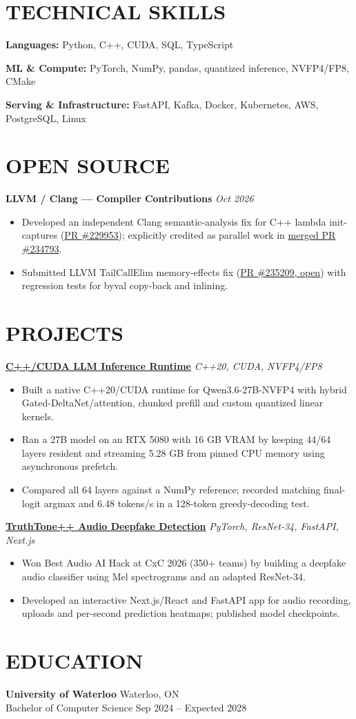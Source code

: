 \documentclass[11pt,letterpaper]{article}
\begin{document}
\section*{TECHNICAL SKILLS}
\noindent\textbf{Languages:} Python, C++, CUDA, SQL, TypeScript\par
\noindent\textbf{ML \& Compute:} PyTorch, NumPy, pandas, quantized inference, NVFP4/FP8, CMake\par
\noindent\textbf{Serving \& Infrastructure:} FastAPI, Kafka, Docker, Kubernetes, AWS, PostgreSQL, Linux\par
\section*{OPEN SOURCE}
\noindent\textbf{LLVM / Clang --- Compiler Contributions} \hfill \textit{Oct 2026}\par
\begin{itemize}
\item Developed an independent Clang semantic-analysis fix for C++ lambda init-captures (\href{https://github.com/llvm/llvm-project/pull/229953}{PR \#229953}); explicitly credited as parallel work in \href{https://github.com/llvm/llvm-project/pull/234793}{merged PR \#234793}.
\item Submitted LLVM TailCallElim memory-effects fix (\href{https://github.com/llvm/llvm-project/pull/235209}{PR \#235209, open}) with regression tests for byval copy-back and inlining.
\end{itemize}
\section*{PROJECTS}
\noindent\href{https://github.com/beanscrack/LLM-Inference-C-CUDA-}{\textbf{C++/CUDA LLM Inference Runtime}} \hfill \textit{C++20, CUDA, NVFP4/FP8}\par
\begin{itemize}
\item Built a native C++20/CUDA runtime for Qwen3.6-27B-NVFP4 with hybrid Gated-DeltaNet/attention, chunked prefill and custom quantized linear kernels.
\item Ran a 27B model on an RTX 5080 with 16 GB VRAM by keeping 44/64 layers resident and streaming 5.28 GB from pinned CPU memory using asynchronous prefetch.
\item Compared all 64 layers against a NumPy reference; recorded matching final-logit argmax and 6.48 tokens/s in a 128-token greedy-decoding test.
\end{itemize}
\noindent\href{https://github.com/beanscrack/Truth-Tone}{\textbf{TruthTone++ Audio Deepfake Detection}} \hfill \textit{PyTorch, ResNet-34, FastAPI, Next.js}\par
\begin{itemize}
\item Won Best Audio AI Hack at CxC 2026 (350+ teams) by building a deepfake audio classifier using Mel spectrograms and an adapted ResNet-34.
\item Developed an interactive Next.js/React and FastAPI app for audio recording, uploads and per-second prediction heatmaps; published model checkpoints.
\end{itemize}
\section*{EDUCATION}
\noindent\textbf{University of Waterloo} \hfill Waterloo, ON\\
Bachelor of Computer Science \hfill Sep 2024 -- Expected 2028\par
\end{document}
